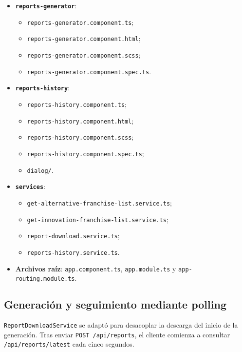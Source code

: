 \documentclass[11pt,a4paper,titlepage,oneside]{report}
\begin{document}
\begin{itemize}

  \item \textbf{\texttt{reports-generator}}:
  \begin{itemize}
    \item \texttt{reports-generator.component.ts};
    \item \texttt{reports-generator.component.html};
    \item \texttt{reports-generator.component.scss};
    \item \texttt{reports-generator.component.spec.ts}.
  \end{itemize}

  \item \textbf{\texttt{reports-history}}:
  \begin{itemize}
    \item \texttt{reports-history.component.ts};
    \item \texttt{reports-history.component.html};
    \item \texttt{reports-history.component.scss};
    \item \texttt{reports-history.component.spec.ts};
    \item \texttt{dialog/}.
  \end{itemize}

  \item \textbf{\texttt{services}}:
  \begin{itemize}
    \item \texttt{get-alternative-franchise-list.service.ts};
    \item \texttt{get-innovation-franchise-list.service.ts};
    \item \texttt{report-download.service.ts};
    \item \texttt{reports-history.service.ts}.
  \end{itemize}

  \item \textbf{Archivos raíz}: \texttt{app.component.ts},
  \texttt{app.module.ts} y \texttt{app-routing.module.ts}.

\end{itemize}

\subsection{Generación y seguimiento mediante polling}

\texttt{ReportDownloadService} se adaptó para desacoplar la descarga del inicio
de la generación. Tras enviar \texttt{POST /api/reports}, el cliente comienza
a consultar \texttt{/api/reports/latest} cada cinco segundos.
\end{document}
